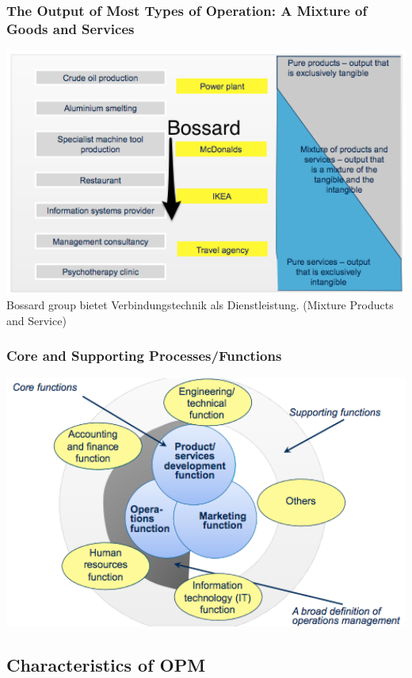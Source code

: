 \subsubsection{The Output of Most Types of Operation: A Mixture of Goods and Services}
\includegraphics[width=1\textwidth]{W01/goods_and_services}
Bossard group bietet Verbindungstechnik als Dienstleistung. (Mixture  Products and Service)
 
\subsubsection{Core and Supporting Processes/Functions }
\includegraphics[width=1\textwidth]{W01/core_and_supporting_processes}

\subsection{Characteristics of OPM}
